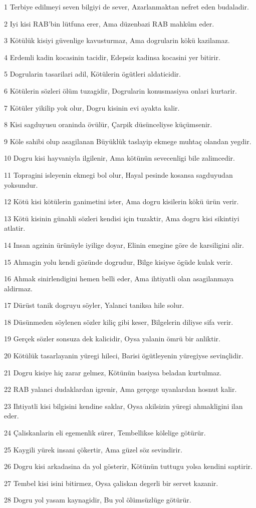 \par 1 Terbiye edilmeyi seven bilgiyi de sever, Azarlanmaktan nefret eden budaladir.
\par 2 Iyi kisi RAB'bin lütfuna erer, Ama düzenbazi RAB mahkûm eder.
\par 3 Kötülük kisiyi güvenlige kavusturmaz, Ama dogrularin kökü kazilamaz.
\par 4 Erdemli kadin kocasinin tacidir, Edepsiz kadinsa kocasini yer bitirir.
\par 5 Dogrularin tasarilari adil, Kötülerin ögütleri aldaticidir.
\par 6 Kötülerin sözleri ölüm tuzagidir, Dogrularin konusmasiysa onlari kurtarir.
\par 7 Kötüler yikilip yok olur, Dogru kisinin evi ayakta kalir.
\par 8 Kisi sagduyusu oraninda övülür, Çarpik düsünceliyse küçümsenir.
\par 9 Köle sahibi olup asagilanan Büyüklük taslayip ekmege muhtaç olandan yegdir.
\par 10 Dogru kisi hayvaniyla ilgilenir, Ama kötünün sevecenligi bile zalimcedir.
\par 11 Topragini isleyenin ekmegi bol olur, Hayal pesinde kosansa sagduyudan yoksundur.
\par 12 Kötü kisi kötülerin ganimetini ister, Ama dogru kisilerin kökü ürün verir.
\par 13 Kötü kisinin günahli sözleri kendisi için tuzaktir, Ama dogru kisi sikintiyi atlatir.
\par 14 Insan agzinin ürünüyle iyilige doyar, Elinin emegine göre de karsiligini alir.
\par 15 Ahmagin yolu kendi gözünde dogrudur, Bilge kisiyse ögüde kulak verir.
\par 16 Ahmak sinirlendigini hemen belli eder, Ama ihtiyatli olan asagilanmaya aldirmaz.
\par 17 Dürüst tanik dogruyu söyler, Yalanci taniksa hile solur.
\par 18 Düsünmeden söylenen sözler kiliç gibi keser, Bilgelerin diliyse sifa verir.
\par 19 Gerçek sözler sonsuza dek kalicidir, Oysa yalanin ömrü bir anliktir.
\par 20 Kötülük tasarlayanin yüregi hileci, Barisi ögütleyenin yüregiyse sevinçlidir.
\par 21 Dogru kisiye hiç zarar gelmez, Kötünün basiysa beladan kurtulmaz.
\par 22 RAB yalanci dudaklardan igrenir, Ama gerçege uyanlardan hosnut kalir.
\par 23 Ihtiyatli kisi bilgisini kendine saklar, Oysa akilsizin yüregi ahmakligini ilan eder.
\par 24 Çaliskanlarin eli egemenlik sürer, Tembellikse kölelige götürür.
\par 25 Kaygili yürek insani çökertir, Ama güzel söz sevindirir.
\par 26 Dogru kisi arkadasina da yol gösterir, Kötünün tuttugu yolsa kendini saptirir.
\par 27 Tembel kisi isini bitirmez, Oysa çaliskan degerli bir servet kazanir.
\par 28 Dogru yol yasam kaynagidir, Bu yol ölümsüzlüge götürür.

